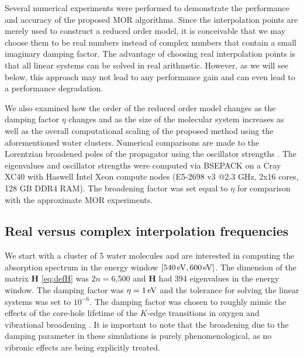 Several numerical experiments were performed to demonstrate the performance and accuracy of the proposed MOR algorithms. Since the interpolation points are merely used to construct a reduced order model, it is conceivable that we may choose them to be real numbers instead of complex numbers that contain a small imaginary damping factor.  The advantage of choosing real interpolation points is that all linear systems can be solved in real arithmetic. However, as we will see below, this approach may not lead to any performance gain and can even lead to a performance degradation.

We also examined how the order of the reduced order model changes as the damping factor $\eta$ changes and as the size of the molecular system increases as well as the overall computational scaling of the proposed method using the aforementioned water clusters. Numerical comparisons are made to the Lorentzian broadened poles of the propagator using the oscillator strengths \cite{Ball64_844,Harris69_3947,McKoy75_1168}. The eigenvalues and oscillator strengths were computed via BSEPACK \cite{bsepack,SJYDL2016} on a Cray XC40 with Haswell Intel Xeon compute nodes (E5-2698 v3 @2.3 GHz, 2x16 cores, 128 GB DDR4 RAM). The broadening factor was set equal to $\eta$ for comparison with the approximate MOR experiments.

\subsection{Real versus complex interpolation frequencies}
\label{sec:MORresults-points}

We start with a cluster of 5 water molecules and are interested in computing
the absorption spectrum in the energy window $[540\,\mathrm{eV},600\,\mathrm{eV}]$. The
dimension of the matrix $\mathbf{H}$ \cref{eq:defH} was $2n = 6$,500 and $\mathbf{H}$ had
394 eigenvalues in the energy window. The damping factor was $\eta = 1\,\mathrm{eV}$
and the tolerance for solving the linear systems was set to $10^{-6}$. The
damping factor was chosen to roughly mimic the effects of the core-hole
lifetime of the $K$-edge transitions in oxygen and vibrational
broadening \cite{Stohr13_book}. It is important to note that the broadening due to
the damping parameter in these simulations is purely phenomenological, as no
vibronic effects are being explicitly treated.


